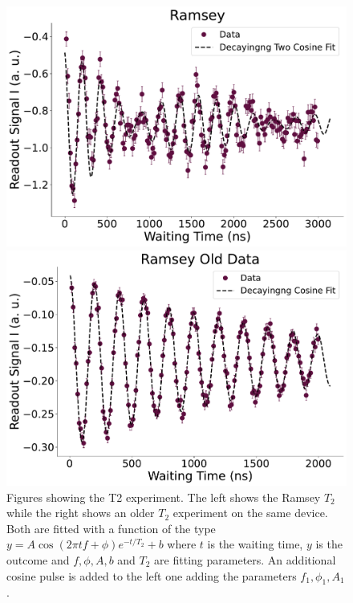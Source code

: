 \begin{figure}[t]
    \begin{minipage}{0.50\linewidth}
        \centering
        \includegraphics[width=1.0\linewidth]{Calibrations/Figures/Ramsey.pdf} %
    \end{minipage}
    \begin{minipage}{0.50\linewidth}
        \centering
        \includegraphics[width = 1.0 \linewidth]{Calibrations/Figures/Ramsey Old Data.pdf}        
    \end{minipage}
    \caption{Figures showing the T2 experiment. The left shows the Ramsey $T_2$ while the right shows an older $T_2$ experiment on the same device. Both are fitted with a function of the type $y = A \cos(2 \pi t f + \phi) e^{-t / T_2} + b$ where $t$ is the waiting time, $y$ is the outcome and $f, \phi, A, b$ and $T_2$ are fitting parameters. An additional cosine pulse is added to the left one adding the parameters $f_1, \phi_1, A_1$.}
    \label{fig:calibrations_t2}
\end{figure}
